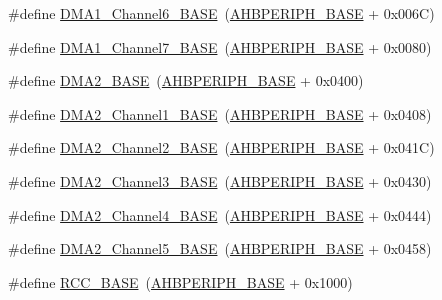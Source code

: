 \begin{DoxyCompactItemize}
\item 
\#define \hyperlink{group___peripheral__memory__map_ga896c2c7585dd8bc3969cf8561f689d2d}{D\+M\+A1\+\_\+\+Channel6\+\_\+\+B\+A\+SE}~(\hyperlink{group___peripheral__memory__map_ga92eb5d49730765d2abd0f5b09548f9f5}{A\+H\+B\+P\+E\+R\+I\+P\+H\+\_\+\+B\+A\+SE} + 0x006\+C)
\item 
\#define \hyperlink{group___peripheral__memory__map_gaeee0d1f77d0db1db533016a09351166c}{D\+M\+A1\+\_\+\+Channel7\+\_\+\+B\+A\+SE}~(\hyperlink{group___peripheral__memory__map_ga92eb5d49730765d2abd0f5b09548f9f5}{A\+H\+B\+P\+E\+R\+I\+P\+H\+\_\+\+B\+A\+SE} + 0x0080)
\item 
\#define \hyperlink{group___peripheral__memory__map_gab72a9ae145053ee13d1d491fb5c1df64}{D\+M\+A2\+\_\+\+B\+A\+SE}~(\hyperlink{group___peripheral__memory__map_ga92eb5d49730765d2abd0f5b09548f9f5}{A\+H\+B\+P\+E\+R\+I\+P\+H\+\_\+\+B\+A\+SE} + 0x0400)
\item 
\#define \hyperlink{group___peripheral__memory__map_gad3bd6c4201d12f5d474518c1b02f8e3b}{D\+M\+A2\+\_\+\+Channel1\+\_\+\+B\+A\+SE}~(\hyperlink{group___peripheral__memory__map_ga92eb5d49730765d2abd0f5b09548f9f5}{A\+H\+B\+P\+E\+R\+I\+P\+H\+\_\+\+B\+A\+SE} + 0x0408)
\item 
\#define \hyperlink{group___peripheral__memory__map_ga22f39f23c879c699b88e04a629f69d1c}{D\+M\+A2\+\_\+\+Channel2\+\_\+\+B\+A\+SE}~(\hyperlink{group___peripheral__memory__map_ga92eb5d49730765d2abd0f5b09548f9f5}{A\+H\+B\+P\+E\+R\+I\+P\+H\+\_\+\+B\+A\+SE} + 0x041\+C)
\item 
\#define \hyperlink{group___peripheral__memory__map_ga6f2369b8bc155fb55a28891987605c2c}{D\+M\+A2\+\_\+\+Channel3\+\_\+\+B\+A\+SE}~(\hyperlink{group___peripheral__memory__map_ga92eb5d49730765d2abd0f5b09548f9f5}{A\+H\+B\+P\+E\+R\+I\+P\+H\+\_\+\+B\+A\+SE} + 0x0430)
\item 
\#define \hyperlink{group___peripheral__memory__map_ga01b063266473f290a55047654fbbfbee}{D\+M\+A2\+\_\+\+Channel4\+\_\+\+B\+A\+SE}~(\hyperlink{group___peripheral__memory__map_ga92eb5d49730765d2abd0f5b09548f9f5}{A\+H\+B\+P\+E\+R\+I\+P\+H\+\_\+\+B\+A\+SE} + 0x0444)
\item 
\#define \hyperlink{group___peripheral__memory__map_ga1eea983a5d68bf36f4d19fbb07955ca1}{D\+M\+A2\+\_\+\+Channel5\+\_\+\+B\+A\+SE}~(\hyperlink{group___peripheral__memory__map_ga92eb5d49730765d2abd0f5b09548f9f5}{A\+H\+B\+P\+E\+R\+I\+P\+H\+\_\+\+B\+A\+SE} + 0x0458)
\item 
\#define \hyperlink{group___peripheral__memory__map_ga0e681b03f364532055d88f63fec0d99d}{R\+C\+C\+\_\+\+B\+A\+SE}~(\hyperlink{group___peripheral__memory__map_ga92eb5d49730765d2abd0f5b09548f9f5}{A\+H\+B\+P\+E\+R\+I\+P\+H\+\_\+\+B\+A\+SE} + 0x1000)

\end{DoxyCompactItemize}
